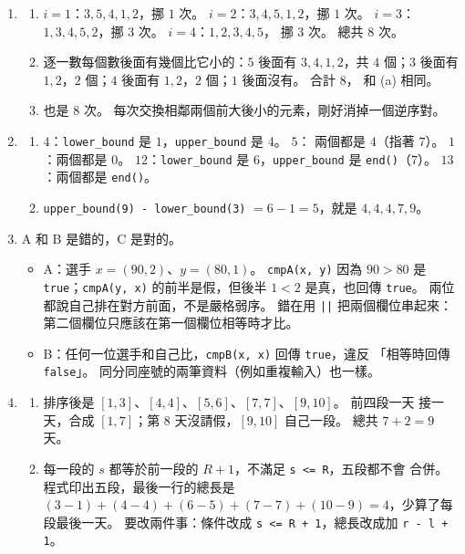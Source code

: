 \begin{enumerate}
\item
\begin{enumerate}
\item $i = 1$：$3, 5, 4, 1, 2$，挪 $1$ 次。 $i = 2$：$3, 4, 5, 1, 2$，挪
$1$ 次。 $i = 3$：$1, 3, 4, 5, 2$，挪 $3$ 次。 $i = 4$：$1, 2, 3, 4, 5$，
挪 $3$ 次。 總共 $8$ 次。
\item 逐一數每個數後面有幾個比它小的：$5$ 後面有 $3, 4, 1, 2$，共 $4$ 個；$3$
後面有 $1, 2$，$2$ 個；$4$ 後面有 $1, 2$，$2$ 個；$1$ 後面沒有。 合計 $8$，
和 (a) 相同。
\item 也是 $8$ 次。 每次交換相鄰兩個前大後小的元素，剛好消掉一個逆序對。
\end{enumerate}

\item
\begin{enumerate}
\item $4$：\texttt{lower\_bound} 是 $1$，\texttt{upper\_bound} 是 $4$。 $5$：
兩個都是 $4$（指著 $7$）。 $1$：兩個都是 $0$。 $12$：\texttt{lower\_bound}
是 $6$，\texttt{upper\_bound} 是 \texttt{end()}（$7$）。 $13$：兩個都是
\texttt{end()}。
\item \texttt{upper\_bound(9) - lower\_bound(3)} $= 6 - 1 = 5$，就是 $4, 4, 4,
7, 9$。
\end{enumerate}

\item A 和 B 是錯的，C 是對的。
\begin{itemize}
\item A：選手 $x = (90, 2)$、$y = (80, 1)$。 \texttt{cmpA(x, y)} 因為 $90 > 80$
是 \texttt{true}；\texttt{cmpA(y, x)} 的前半是假，但後半 $1 < 2$ 是真，也回傳
\texttt{true}。 兩位都說自己排在對方前面，不是嚴格弱序。 錯在用 \texttt{||}
把兩個欄位串起來：第二個欄位只應該在第一個欄位相等時才比。
\item B：任何一位選手和自己比，\texttt{cmpB(x, x)} 回傳 \texttt{true}，違反
「相等時回傳 \texttt{false}」。 同分同座號的兩筆資料（例如重複輸入）也一樣。
\end{itemize}

\item
\begin{enumerate}
\item 排序後是 $[1, 3]$、$[4, 4]$、$[5, 6]$、$[7, 7]$、$[9, 10]$。 前四段一天
接一天，合成 $[1, 7]$；第 $8$ 天沒請假，$[9, 10]$ 自己一段。 總共 $7 + 2 = 9$
天。
\item 每一段的 $s$ 都等於前一段的 $R + 1$，不滿足 \texttt{s <= R}，五段都不會
合併。 程式印出五段，最後一行的總長是 $(3 - 1) + (4 - 4) + (6 - 5) + (7 - 7)
+ (10 - 9) = 4$，少算了每段最後一天。 要改兩件事：條件改成
\texttt{s <= R + 1}，總長改成加 \texttt{r - l + 1}。
\end{enumerate}


\end{enumerate}
